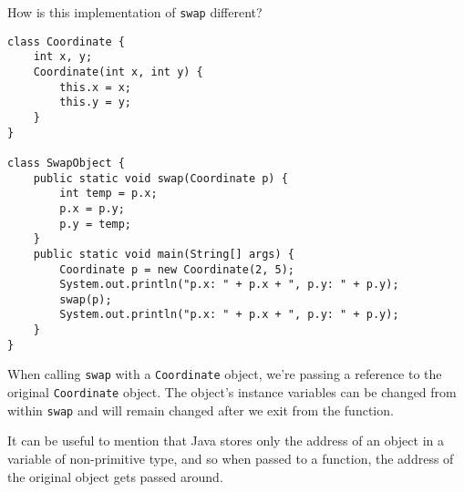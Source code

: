 \begin{blocksection}
\question How is this implementation of \lstinline$swap$ different?

\begin{lstlisting}
class Coordinate {
    int x, y;
    Coordinate(int x, int y) {
        this.x = x;
        this.y = y;
    }
}

class SwapObject {
    public static void swap(Coordinate p) {
        int temp = p.x;
        p.x = p.y;
        p.y = temp;
    }
    public static void main(String[] args) {
        Coordinate p = new Coordinate(2, 5);
        System.out.println("p.x: " + p.x + ", p.y: " + p.y);
        swap(p);
        System.out.println("p.x: " + p.x + ", p.y: " + p.y);
    }
}
\end{lstlisting}

\begin{solution}
When calling \lstinline$swap$ with a \lstinline$Coordinate$ object, we're
passing a reference to the original \lstinline$Coordinate$ object. The object's
instance variables can be changed from within \lstinline$swap$ and will remain
changed after we exit from the function.

\begin{meta} 
It can be useful to mention that Java stores only the address of
an object in a variable of non-primitive type, and so when passed to a
function, the address of the original object gets passed around.
\end{meta} 
\end{solution}
\end{blocksection}
